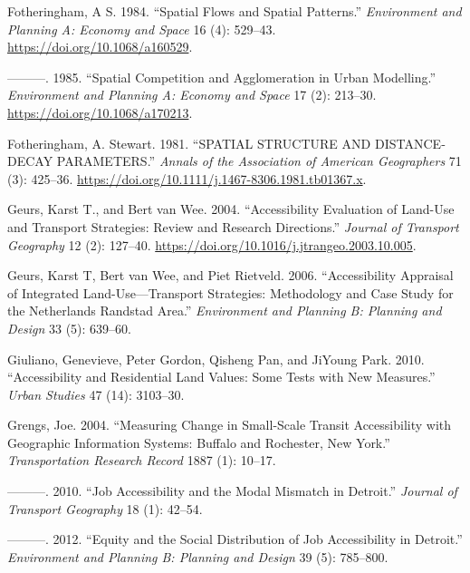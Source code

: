 \documentclass[
]{article}
\newlength{\cslhangindent}
\newenvironment{CSLReferences}[2] %
 {\begin{list}{}{%
  \setlength{\itemindent}{0pt}
  \setlength{\leftmargin}{0pt}
  \setlength{\parsep}{0pt}
  \ifodd #1
   \setlength{\leftmargin}{\cslhangindent}
   \setlength{\itemindent}{-1\cslhangindent}
  \fi
  \setlength{\itemsep}{#2\baselineskip}}}
 {\end{list}}
\begin{document}
\begin{CSLReferences}{1}{0}
Fotheringham, A S. 1984. {``Spatial {Flows} and {Spatial} {Patterns}.''}
\emph{Environment and Planning A: Economy and Space} 16 (4): 529--43.
\url{https://doi.org/10.1068/a160529}.

---------. 1985. {``Spatial Competition and Agglomeration in Urban
Modelling.''} \emph{Environment and Planning A: Economy and Space} 17
(2): 213--30. \url{https://doi.org/10.1068/a170213}.

Fotheringham, A. Stewart. 1981. {``{SPATIAL} {STRUCTURE} {AND}
{DISTANCE}‐{DECAY} {PARAMETERS}.''} \emph{Annals of the Association of
American Geographers} 71 (3): 425--36.
\url{https://doi.org/10.1111/j.1467-8306.1981.tb01367.x}.

Geurs, Karst T., and Bert van Wee. 2004. {``Accessibility Evaluation of
Land-Use and Transport Strategies: Review and Research Directions.''}
\emph{Journal of Transport Geography} 12 (2): 127--40.
\url{https://doi.org/10.1016/j.jtrangeo.2003.10.005}.

Geurs, Karst T, Bert van Wee, and Piet Rietveld. 2006. {``Accessibility
Appraisal of Integrated Land-Use---Transport Strategies: Methodology and
Case Study for the Netherlands Randstad Area.''} \emph{Environment and
Planning B: Planning and Design} 33 (5): 639--60.

Giuliano, Genevieve, Peter Gordon, Qisheng Pan, and JiYoung Park. 2010.
{``Accessibility and Residential Land Values: Some Tests with New
Measures.''} \emph{Urban Studies} 47 (14): 3103--30.

Grengs, Joe. 2004. {``Measuring Change in Small-Scale Transit
Accessibility with Geographic Information Systems: Buffalo and
Rochester, New York.''} \emph{Transportation Research Record} 1887 (1):
10--17.

---------. 2010. {``Job Accessibility and the Modal Mismatch in
Detroit.''} \emph{Journal of Transport Geography} 18 (1): 42--54.

---------. 2012. {``Equity and the Social Distribution of Job
Accessibility in Detroit.''} \emph{Environment and Planning B: Planning
and Design} 39 (5): 785--800.


\end{CSLReferences}
\end{document}
